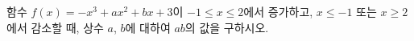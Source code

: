 함수 $f(x)=-x^3+ax^2+bx+3$이 $-1\le x\le 2$에서 증가하고, $x\le -1$ 또는 $x\ge 2$에서 감소할 때, 상수 $a$, $b$에 대하여 $ab$의 값을 구하시오.
